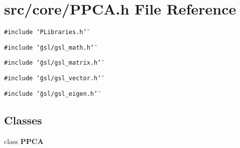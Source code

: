 \section{src/core/PPCA.h File Reference}
\label{PPCA_8h}


{\tt \#include \char`\"{}PLibraries.h\char`\"{}}\par
{\tt \#include \char`\"{}gsl/gsl\_\-math.h\char`\"{}}\par
{\tt \#include \char`\"{}gsl/gsl\_\-matrix.h\char`\"{}}\par
{\tt \#include \char`\"{}gsl/gsl\_\-vector.h\char`\"{}}\par
{\tt \#include \char`\"{}gsl/gsl\_\-eigen.h\char`\"{}}\par
\subsection*{Classes}
\begin{CompactItemize}
\item 
class {\bf PPCA}
\end{CompactItemize}
